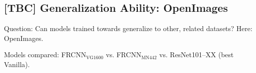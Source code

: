 \begin{table}[t]
\caption{Break-down of the results for the \textit{wrong} name predictions. Proportions (in \%) of the corresponding categories to all wrongly classified instances.  \label{tab:exp_details_wrong}}
\end{table}

\fi


\subsection{[TBC] Generalization Ability: OpenImages}
\label{sect:exp_openimages}
Question: Can models trained towards \mn generalize to other, related datasets? Here: OpenImages. \

Models compared: FRCNN$_{\text{VG1600}}$ vs. FRCNN$_{\text{MN442}}$ vs. ResNet101--XX (best Vanilla).

